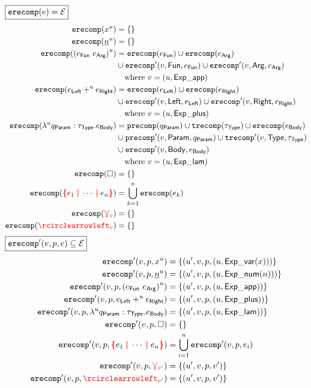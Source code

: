 \noindent $\boxed{\operatorname{\texttt{erecomp}}\mathopen{}\left(e\right)\mathclose{} = \mathcal{E}}$
%
\begin{align*}
  \erecomp{\varExp{x}{u}} &= \SetOf{}
  \\
  \erecomp{\numExp{n}{u}} &= \SetOf{}
  \\
  \erecomp{\appExp{e_\AppFun}{e_\AppArg}{u}}
  &= \erecomp{e_\AppFun}
  \cup \erecomp{e_\AppArg} \\
  &\cup \erecompPrime{v}{\AppFun}{e_\AppFun}
  \cup \erecompPrime{v}{\AppArg}{e_\AppArg} \\
  &\quad\text{where } v = (u, \ExpApp)
  \\
  \erecomp{\plusExp{e_\PlusLeft}{u}{e_\PlusRight}}
  &= \erecomp{e_\PlusLeft}
  \cup \erecomp{e_\PlusRight} \\
  &\cup \erecompPrime{v}{\PlusLeft}{e_\PlusLeft}
  \cup \erecompPrime{v}{\PlusRight}{e_\PlusRight} \\
  &\quad\text{where } v = (u, \ExpPlus)
  \\
  \erecomp{\lamExp{u}{q_\LamParam}{\tau_\LamType}{e_\LamBody}}
  &= \precomp{q_\LamParam}
  \cup \trecomp{\tau_\LamType}
  \cup \erecomp{e_\LamBody} \\
  &\cup \precompPrime{v}{\LamParam}{q_\LamParam}
  \cup \trecompPrime{v}{\LamType}{\tau_\LamType} \\
  &\cup \erecompPrime{v}{\LamBody}{e_\LamBody} \\
  &\quad\text{where } v = (u, \ExpLam)
  \\
  \erecomp{\hole} &= \SetOf{}
  \\
  \erecomp{\conflictHole{e_1, \cdots, e_n}}
  &= \bigcup_{k=1}^n \erecomp{e_k}
  \\
  \erecomp{\multiVertex{v}} &= \SetOf{}
  \\
  \erecomp{\cycleVertex{v}} &= \SetOf{}
\end{align*}
%
$\boxed{\operatorname{\operatorname{\texttt{erecomp}}^\prime}\mathopen{}\left(v, p, e\right)\mathclose{} \subseteq \mathcal{E}}$
%
\begin{align*}
  \erecompPrime{v}{p}{\varExp{x}{u}}
  &= \SetOf{(u', v, p, (u, \ExpVar(x)))}
  \\
  \erecompPrime{v}{p}{\numExp{n}{u}}
  &= \SetOf{(u', v, p, (u, \ExpNum(n)))}
  \\
  \erecompPrime{v}{p}{\appExp{e_\AppFun}{e_\AppArg}{u}}
  &= \SetOf{(u', v, p, (u, \ExpApp))}
  \\
  \erecompPrime{v}{p}{\plusExp{e_\PlusLeft}{u} {e_\PlusRight}}
  &= \SetOf{(u', v, p, (u, \ExpPlus))}
  \\
  \erecompPrime{v}{p}{\lamExp{u}{q_\LamParam}{\tau_\LamType}{e_\LamBody}}
  &= \SetOf{(u', v, p, (u, \ExpLam))}
  \\
  \erecompPrime{v}{p}{\hole} &= \SetOf{}
  \\
  \erecompPrime{v}{p}{\conflictHole{e_1, \cdots, e_n}}
  &= \bigcup_{i=1}^n \erecompPrime{v}{p}{e_i}
  \\
  \erecompPrime{v}{p}{\multiVertex{v'}}
  &= \SetOf{(u', v, p, v')}
  \\
  \erecompPrime{v}{p}{\cycleVertex{v'}}
  &= \SetOf{(u', v, p, v')}
\end{align*}
